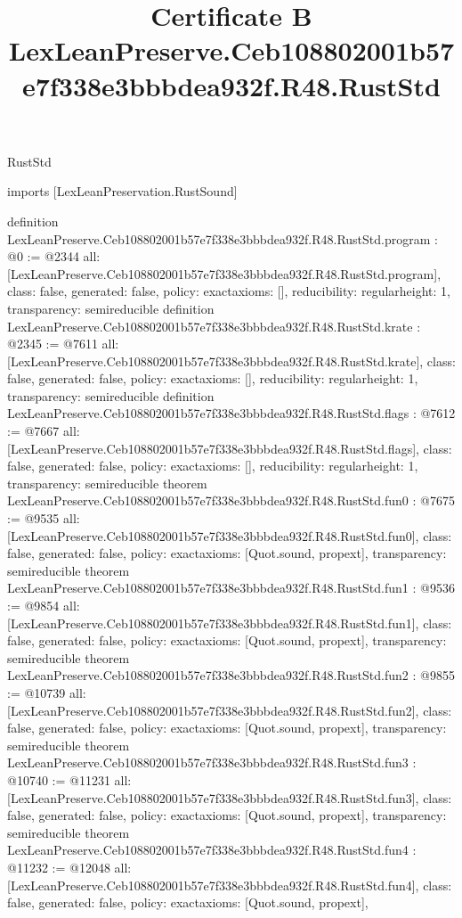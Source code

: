 \begin{lexlean}{RustStd}
\title{Certificate B LexLeanPreserve.Ceb108802001b57e7f338e3bbbdea932f.R48.RustStd}
\begin{coremodule}
imports [LexLeanPreservation.RustSound]

definition LexLeanPreserve.Ceb108802001b57e7f338e3bbbdea932f.R48.RustStd.program : @0 := @2344 {
  all: [LexLeanPreserve.Ceb108802001b57e7f338e3bbbdea932f.R48.RustStd.program],
  class: false,
  generated: false,
  policy: exact{axioms: []},
  reducibility: regular{height: 1},
  transparency: semireducible
}
definition LexLeanPreserve.Ceb108802001b57e7f338e3bbbdea932f.R48.RustStd.krate : @2345 := @7611 {
  all: [LexLeanPreserve.Ceb108802001b57e7f338e3bbbdea932f.R48.RustStd.krate],
  class: false,
  generated: false,
  policy: exact{axioms: []},
  reducibility: regular{height: 1},
  transparency: semireducible
}
definition LexLeanPreserve.Ceb108802001b57e7f338e3bbbdea932f.R48.RustStd.flags : @7612 := @7667 {
  all: [LexLeanPreserve.Ceb108802001b57e7f338e3bbbdea932f.R48.RustStd.flags],
  class: false,
  generated: false,
  policy: exact{axioms: []},
  reducibility: regular{height: 1},
  transparency: semireducible
}
theorem LexLeanPreserve.Ceb108802001b57e7f338e3bbbdea932f.R48.RustStd.fun0 : @7675 := @9535 {
  all: [LexLeanPreserve.Ceb108802001b57e7f338e3bbbdea932f.R48.RustStd.fun0],
  class: false,
  generated: false,
  policy: exact{axioms: [Quot.sound, propext]},
  transparency: semireducible
}
theorem LexLeanPreserve.Ceb108802001b57e7f338e3bbbdea932f.R48.RustStd.fun1 : @9536 := @9854 {
  all: [LexLeanPreserve.Ceb108802001b57e7f338e3bbbdea932f.R48.RustStd.fun1],
  class: false,
  generated: false,
  policy: exact{axioms: [Quot.sound, propext]},
  transparency: semireducible
}
theorem LexLeanPreserve.Ceb108802001b57e7f338e3bbbdea932f.R48.RustStd.fun2 : @9855 := @10739 {
  all: [LexLeanPreserve.Ceb108802001b57e7f338e3bbbdea932f.R48.RustStd.fun2],
  class: false,
  generated: false,
  policy: exact{axioms: [Quot.sound, propext]},
  transparency: semireducible
}
theorem LexLeanPreserve.Ceb108802001b57e7f338e3bbbdea932f.R48.RustStd.fun3 : @10740 := @11231 {
  all: [LexLeanPreserve.Ceb108802001b57e7f338e3bbbdea932f.R48.RustStd.fun3],
  class: false,
  generated: false,
  policy: exact{axioms: [Quot.sound, propext]},
  transparency: semireducible
}
theorem LexLeanPreserve.Ceb108802001b57e7f338e3bbbdea932f.R48.RustStd.fun4 : @11232 := @12048 {
  all: [LexLeanPreserve.Ceb108802001b57e7f338e3bbbdea932f.R48.RustStd.fun4],
  class: false,
  generated: false,
  policy: exact{axioms: [Quot.sound, propext]},
}
\end{coremodule}
\end{lexlean}
